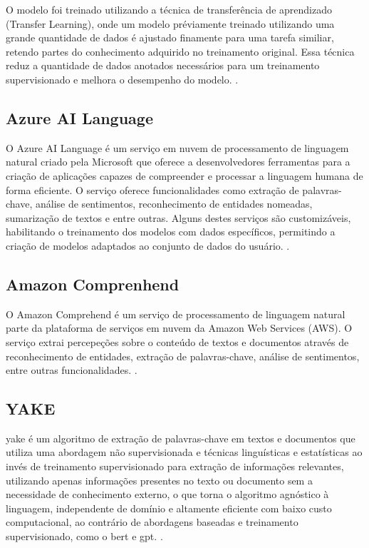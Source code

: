 O modelo foi treinado utilizando a técnica de transferência de aprendizado (Transfer Learning), onde um modelo préviamente treinado utilizando uma grande quantidade de dados é ajustado finamente para uma tarefa similiar, retendo partes do conhecimento adquirido no treinamento original. Essa técnica reduz a quantidade de dados anotados necessários para um treinamento supervisionado e melhora o desempenho do modelo. \cite{souza2020bertimbau}.

\subsection{Azure AI Language}\label{subsec:azure}

O Azure AI Language é um serviço em nuvem de processamento de linguagem natural criado pela Microsoft que oferece a desenvolvedores ferramentas para a criação de aplicações capazes de compreender e processar a linguagem humana de forma eficiente. O serviço oferece funcionalidades como extração de palavras-chave, análise de sentimentos, reconhecimento de entidades nomeadas, sumarização de textos e entre outras. Alguns destes serviços são customizáveis, habilitando o treinamento dos modelos com dados específicos, permitindo a criação de modelos adaptados ao conjunto de dados do usuário. \cite{AzureAILanguage}.

\subsection{Amazon Comprenhend}\label{subsec:comprehend}

O Amazon Comprehend é um serviço de processamento de linguagem natural parte da plataforma de serviços em nuvem da Amazon Web Services (AWS). O serviço extrai percepeções sobre o conteúdo de textos e documentos através de reconhecimento de entidades, extração de palavras-chave, análise de sentimentos, entre outras funcionalidades. \cite{AmazonComprehend}.

\subsection{YAKE}\label{subsec:yake}

\gls{yake} é um algoritmo de extração de palavras-chave em textos e documentos que utiliza uma abordagem não supervisionada e técnicas linguísticas e estatísticas ao invés de treinamento supervisionado para extração de informações relevantes, utilizando apenas informações presentes no texto ou documento sem a necessidade de conhecimento externo, o que torna o algoritmo agnóstico à linguagem, independente de domínio e altamente eficiente com baixo custo computacional, ao contrário de abordagens baseadas e treinamento supervisionado, como o \gls{bert} e \gls{gpt}. \cite{YakeKeywordExtractor}.

